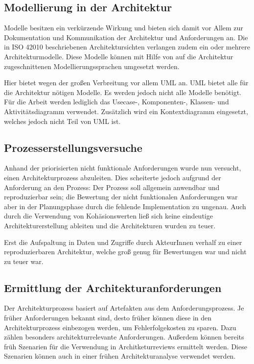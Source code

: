 \subsection{Modellierung in der Architektur}
Modelle besitzen ein verkürzende Wirkung und bieten sich damit vor Allem zur Dokumentation und Kommunikation der Architektur und Anforderungen an. Die in ISO 42010 beschriebenen Architektursichten verlangen zudem ein oder mehrere Architekturmodelle. Diese Modelle können mit Hilfe von auf die Architektur zugeschnittenen Modellierungssprachen umgesetzt werden.

Hier bietet wegen der großen Verbreitung vor allem UML an. UML bietet alle für die Architektur nötigen Modelle. Es werden jedoch nicht alle Modelle benötigt. Für die Arbeit werden lediglich das Usecase-, Komponenten-, Klassen- und Aktivitätsdiagramm verwendet. Zusätzlich wird ein Kontextdiagramm eingesetzt, welches jedoch nicht Teil von UML ist.

\subsection{Prozesserstellungsversuche}
Anhand der priorisierten nicht funktionale Anforderungen wurde nun versucht, einen Architekturprozess abzuleiten. Dies scheiterte jedoch aufgrund der Anforderung an den Prozess: Der Prozess soll allgemein anwendbar und reproduzierbar sein; die Bewertung der nicht funktionalen Anforderungen war aber in der Planungsphase durch die fehlende Implementation zu ungenau. Auch durch die Verwendung von Kohäsionswerten ließ sich keine eindeutige Architekturerstellung ableiten und die Architekturen wurden zu teuer.

Erst die Aufspaltung in Daten und Zugriffe durch AkteurInnen verhalf zu einer reproduzierbaren Architektur, welche groß genug für Bewertungen war und nicht zu teuer war.

\subsection{Ermittlung der Architekturanforderungen}
Der Architekturprozess basiert auf Artefakten aus dem Anforderungsprozess. Je früher Anforderungen bekannt sind, desto früher können diese in den Architekturprozess einbezogen werden, um Fehlerfolgekosten zu sparen. Dazu zählen besonders architekturrelevante Anforderungen. Außerdem können bereits früh Szenarien für die Verwendung in Architketurreviews ermittelt werden. Diese Szenarien können auch in einer frühen Architekturanalyse verwendet werden.

